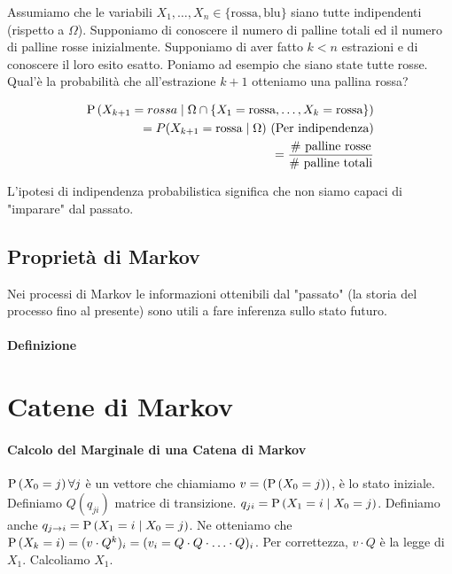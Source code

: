 \begin{exmp}
	Assumiamo che le variabili $ X_1, \hdots, X_n \in \{\text{rossa}, \text{blu}\} $ siano tutte indipendenti (rispetto a $ \Omega $). Supponiamo di conoscere il numero di palline totali ed il numero di palline rosse inizialmente. Supponiamo di aver fatto $ k < n $ estrazioni e di conoscere il loro esito esatto. Poniamo ad esempio che siano state tutte rosse. Qual'è la probabilità che all'estrazione $ k+1 $ otteniamo una pallina rossa?
	
	\begin{equation*}
	\begin{aligned}
	\text{P}\left(X_{k+1} = rossa \mid \Omega \cap \{X_1 = \text{rossa}, \hdots, X_k = \text{rossa} \} \right) \\
	= P(X_{k+1} = \text{rossa} \mid \Omega)	\text{  (Per indipendenza)} \\
	= \dfrac{\text{\# palline rosse}}{\text{\# palline totali}}
	\end{aligned}
	\end{equation*}
	
	L'ipotesi di indipendenza probabilistica significa che non siamo capaci di "imparare" dal passato.
	
\end{exmp}


\subsection{Proprietà di Markov}
Nei processi di Markov le informazioni ottenibili dal "passato" (la storia del processo fino al presente) sono utili a fare inferenza sullo stato futuro.

\paragraph{Definizione}



\section{Catene di Markov}

\paragraph{Calcolo del Marginale di una Catena di Markov}
$ \text{P}\left(X_0 = j\right) \forall j $ è un vettore che chiamiamo $ v = (\text{P}\left(X_0 = j\right)) $, è lo stato iniziale. Definiamo $ Q(q_{ji}) $ matrice di transizione. $ q_{ji} = \text{P}\left(X_1 = i \mid X_0 = j\right) $. Definiamo anche $ q_{j \to i} = \text{P}\left(X_1 = i \mid X_0 = j\right) $. Ne otteniamo che $ \text{P}\left(X_k = i\right) = (v \cdot Q^k)_i = (v_i = Q \cdot Q \cdot \hdots \cdot Q)_i $. Per correttezza, $ v \cdot Q $ è la legge di $ X_1 $. Calcoliamo $ X_1 $.

